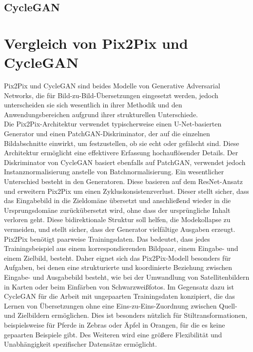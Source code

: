 \subsection{CycleGAN}


\newpage
\section{Vergleich von Pix2Pix und CycleGAN}
Pix2Pix und CycleGAN sind beides Modelle von Generative Adversarial Networks, die für Bild-zu-Bild-Übersetzungen eingesetzt werden, jedoch unterscheiden sie sich wesentlich in ihrer Methodik und den Anwendungsbereichen aufgrund ihrer strukturellen Unterschiede.
\\\newline
Die Pix2Pix-Architektur verwendet typischerweise einen U-Net-basierten Generator und einen PatchGAN-Diskriminator, der auf die einzelnen Bildabschnitte einwirkt, um festzustellen, ob sie echt oder gefälscht sind. Diese Architektur ermöglicht eine effektivere Erfassung hochauflösender Details. 
Der Diskriminator von CycleGAN basiert ebenfalls auf PatchGAN, verwendet jedoch Instanznormalisierung anstelle von Batchnormalisierung. Ein wesentlicher Unterschied besteht in den Generatoren. Diese basieren auf dem ResNet-Ansatz und erweitern Pix2Pix um einen Zykluskonsistenzverlust. Dieser stellt sicher, dass das Eingabebild in die Zieldomäne übersetzt und anschließend wieder in die Ursprungsdomäne zurückübersetzt wird, ohne dass der ursprüngliche Inhalt verloren geht. Diese bidirektionale Struktur soll helfen, die Modekollapse zu vermeiden, und stellt sicher, dass der Generator vielfältige Ausgaben erzeugt.
\\\newline
Pix2Pix benötigt paarweise Trainingsdaten. Das bedeutet, dass jedes Trainingsbeispiel aus einem korrespondierenden Bildpaar, einem Eingabe- und einem Zielbild, besteht. Daher eignet sich das Pix2Pix-Modell besonders für Aufgaben, bei denen eine strukturierte und koordinierte Beziehung zwischen Eingabe- und Ausgabebild besteht, wie bei der Umwandlung von Satellitenbildern in Karten oder beim Einfärben von Schwarzweißfotos. 
Im Gegensatz dazu ist CycleGAN für die Arbeit mit ungepaarten Trainingsdaten konzipiert, die das Lernen von Übersetzungen ohne eine Eins-zu-Eins-Zuordnung zwischen Quell- und Zielbildern ermöglichen. Dies ist besonders nützlich für Stiltransformationen, beispielsweise für Pferde in Zebras oder Äpfel in Orangen, für die es keine gepaarten Beispiele gibt. Des Weiteren wird eine größere Flexibilität und Unabhängigkeit spezifischer Datensätze ermöglicht.
